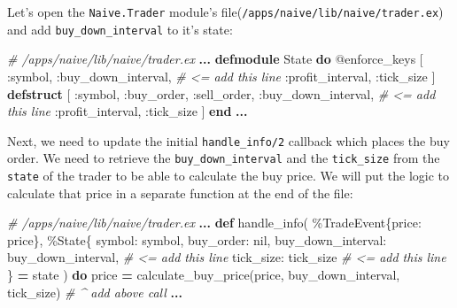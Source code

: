 \documentclass[
  oneside]{book}
\newenvironment{Shaded}{\begin{snugshade}}{\end{snugshade}}
\newcommand{\CommentTok}[1]{\textcolor[rgb]{0.56,0.35,0.01}{\textit{#1}}}
\newcommand{\ConstantTok}[1]{\textcolor[rgb]{0.00,0.00,0.00}{#1}}
\newcommand{\KeywordTok}[1]{\textcolor[rgb]{0.13,0.29,0.53}{\textbf{#1}}}
\newcommand{\NormalTok}[1]{#1}
\newcommand{\OperatorTok}[1]{\textcolor[rgb]{0.81,0.36,0.00}{\textbf{#1}}}
\newcommand{\OtherTok}[1]{\textcolor[rgb]{0.56,0.35,0.01}{#1}}
\newcommand{\VariableTok}[1]{\textcolor[rgb]{0.00,0.00,0.00}{#1}}
\begin{document}
Let's open the \texttt{Naive.Trader} module's file(\texttt{/apps/naive/lib/naive/trader.ex}) and add \texttt{buy\_down\_interval} to it's state:

\begin{Shaded}
\begin{Highlighting}[]
  \CommentTok{\# /apps/naive/lib/naive/trader.ex}
  \OperatorTok{...}
  \KeywordTok{defmodule} \ConstantTok{State} \KeywordTok{do}
    \OtherTok{@enforce\_keys}\NormalTok{ [}
      \VariableTok{:symbol}\NormalTok{,}
      \VariableTok{:buy\_down\_interval}\NormalTok{, }\CommentTok{\# \textless{}= add this line}
      \VariableTok{:profit\_interval}\NormalTok{,}
      \VariableTok{:tick\_size}
\NormalTok{    ]}
    \KeywordTok{defstruct}\NormalTok{ [}
      \VariableTok{:symbol}\NormalTok{,}
      \VariableTok{:buy\_order}\NormalTok{,}
      \VariableTok{:sell\_order}\NormalTok{,}
      \VariableTok{:buy\_down\_interval}\NormalTok{, }\CommentTok{\# \textless{}= add this line}
      \VariableTok{:profit\_interval}\NormalTok{,}
      \VariableTok{:tick\_size}
\NormalTok{    ]}
  \KeywordTok{end}
  \OperatorTok{...}
\end{Highlighting}
\end{Shaded}

Next, we need to update the initial \texttt{handle\_info/2} callback which places the buy order. We need to retrieve the \texttt{buy\_down\_interval} and the \texttt{tick\_size} from the \texttt{state} of the trader to be able to calculate the buy price. We will put the logic to calculate that price in a separate function at the end of the file:

\begin{Shaded}
\begin{Highlighting}[]
  \CommentTok{\# /apps/naive/lib/naive/trader.ex}
  \OperatorTok{...}
  \KeywordTok{def}\NormalTok{ handle\_info(}
\NormalTok{        \%}\ConstantTok{TradeEvent}\NormalTok{\{}\VariableTok{price:}\NormalTok{ price\},}
\NormalTok{        \%}\ConstantTok{State}\NormalTok{\{}
          \VariableTok{symbol:}\NormalTok{ symbol,}
          \VariableTok{buy\_order:} \ConstantTok{nil}\NormalTok{,}
          \VariableTok{buy\_down\_interval:}\NormalTok{ buy\_down\_interval, }\CommentTok{\# \textless{}= add this line}
          \VariableTok{tick\_size:}\NormalTok{ tick\_size                  }\CommentTok{\# \textless{}= add this line          }
\NormalTok{        \} }\OperatorTok{=}\NormalTok{ state}
\NormalTok{      ) }\KeywordTok{do}
\NormalTok{    price }\OperatorTok{=}\NormalTok{ calculate\_buy\_price(price, buy\_down\_interval, tick\_size)}
    \CommentTok{\# \^{} add above call}
    \OperatorTok{...}
\end{Highlighting}
\end{Shaded}
\end{document}
